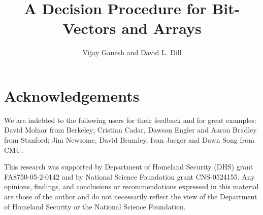 \documentclass{llncs}
\date{}
\title{A Decision Procedure for Bit-Vectors and Arrays}
\author{
Vijay Ganesh and David L. Dill}
\institute{Computer Systems Laboratory \\ 
           Stanford University  \\
	   \{vganesh, dill\} @cs.stanford.edu
         }
\begin{document}
\maketitle

\begin{abstract}

\end{abstract}



\label{sec:overview}


\label{sec:abstractrefine}


\label{sec:linearsolver}


\label{sec:results}



\label{sec:conclusion}


\section*{Acknowledgements}
We are indebted to the following users for their feedback and for
great examples: David Molnar from Berkeley; Cristian Cadar, Dawson
Engler and Aaron Bradley from Stanford; Jim Newsome, David Brumley,
Ivan Jaeger and Dawn Song from CMU;

This research was supported by Department of Homeland Security (DHS)
grant FA8750-05-2-0142 and by National Science Foundation grant
CNS-0524155. Any opinions, findings, and conclusions or
recommendations expressed in this material are those of the author and
do not necessarily reflect the view of the Department of Homeland
Security or the National Science Foundation.

{  }
\end{document}
